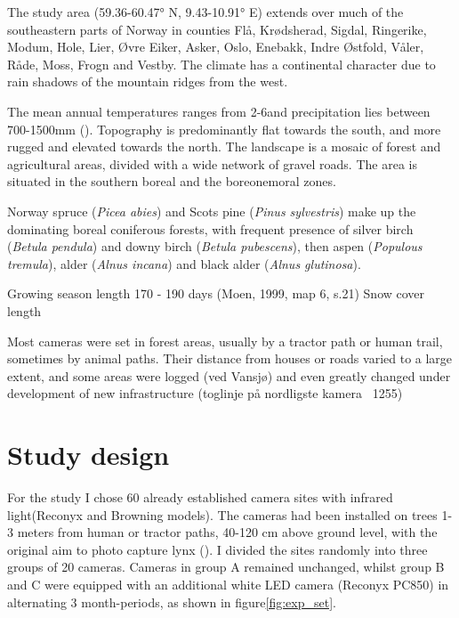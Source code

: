 The study area (59.36-60.47° N, 9.43-10.91° E) %
extends over much of the southeastern parts of Norway in counties Flå, Krødsherad, Sigdal, Ringerike, Modum, Hole, Lier, Øvre Eiker, Asker, Oslo, Enebakk, Indre Østfold, Våler, Råde, Moss, Frogn and Vestby.
The climate has a continental character due to rain shadows of the mountain ridges from the west. 

The mean annual temperatures ranges from 2-6\celsius  and precipitation lies between 700-1500mm (\cite{Moen1999}). 
Topography is predominantly flat towards the south, and more rugged and elevated towards the north. The landscape is a mosaic of forest and agricultural areas, divided with a wide network of gravel roads.
The area is situated in the southern boreal and the boreonemoral zones. %

Norway spruce (\textit{Picea abies}) and Scots pine (\textit{Pinus sylvestris}) make up the dominating boreal coniferous forests, with frequent presence of silver birch (\textit{Betula pendula}) and downy birch (\textit{Betula pubescens}), then aspen (\textit{Populous tremula}), alder (\textit{Alnus incana}) and black alder (\textit{Alnus glutinosa}).

Growing season length 170 - 190 days (Moen, 1999, map 6, s.21) %
Snow cover length												%

Most cameras were set in forest areas, usually by a tractor path or human trail, sometimes by animal paths. Their distance from houses or roads varied to a large extent, and some areas were logged (ved Vansjø) and even greatly changed under development of new infrastructure (toglinje på nordligste kamera ~1255)


\section{Study design} %
For the study I chose 60 already established camera sites with infrared light(Reconyx and Browning models). The cameras had been installed on trees 1-3 meters from human or tractor paths, 40-120 cm above ground level, with the original aim to photo capture lynx (\cite{Odden2015}). 
I divided the sites randomly into three groups of 20 cameras. Cameras in group A remained unchanged, whilst group B and C were equipped with an additional white LED camera (Reconyx PC850) in alternating 3 month-periods, as shown in figure\vref{fig:exp_set}.

